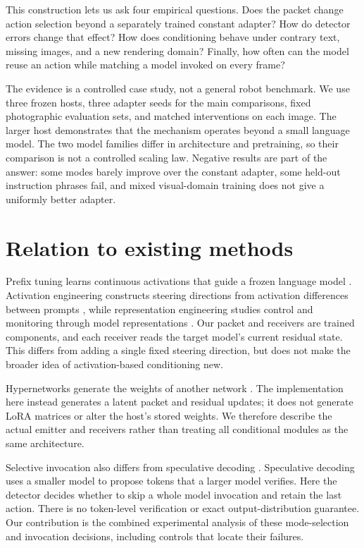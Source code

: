 \documentclass[10pt]{article}
\begin{document}
This construction lets us ask four empirical questions. Does the packet
change action selection beyond a separately trained constant adapter?
How do detector errors change that effect? How does conditioning behave
under contrary text, missing images, and a new rendering domain? Finally,
how often can the model reuse an action while matching a model invoked
on every frame?

The evidence is a controlled case study, not a general robot benchmark.
We use three frozen hosts, three adapter seeds for the main comparisons,
fixed photographic evaluation sets, and matched interventions on each
image. The larger host demonstrates that the mechanism operates beyond a
small language model. The two model families differ in architecture and
pretraining, so their comparison is not a controlled scaling law.
Negative results are part of the answer: some modes barely improve over
the constant adapter, some held-out instruction phrases fail, and mixed
visual-domain training does not give a uniformly better adapter.

\section{Relation to existing methods}
Prefix tuning learns continuous activations that guide a frozen language
model \citep{li2021prefix}. Activation engineering constructs steering
directions from activation differences between prompts
\citep{turner2024steering}, while representation engineering studies
control and monitoring through model representations \citep{zou2023rep}.
Our packet and receivers are trained components, and each receiver reads
the target model's current residual state. This differs from adding a
single fixed steering direction, but does not make the broader idea of
activation-based conditioning new.

Hypernetworks generate the weights of another network
\citep{ha2016hypernetworks}. The implementation here instead generates a
latent packet and residual updates; it does not generate LoRA matrices
or alter the host's stored weights. We therefore describe the actual
emitter and receivers rather than treating all conditional modules as
the same architecture.

Selective invocation also differs from speculative decoding
\citep{leviathan2023fast}. Speculative decoding uses a smaller model to
propose tokens that a larger model verifies. Here the detector decides
whether to skip a whole model invocation and retain the last action.
There is no token-level verification or exact output-distribution
guarantee. Our contribution is the combined experimental analysis of
these mode-selection and invocation decisions, including controls that
locate their failures.
\end{document}
